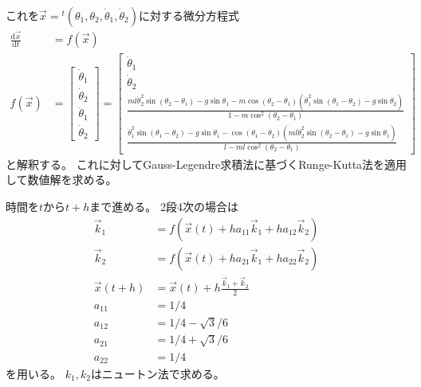 \documentclass{jsarticle}
\newcommand{\eqa}[1]{\begin{align}#1\end{align}}
\newcommand{\fn}[1]{\!\left(#1\right)}
\newcommand{\cost}[2]{\cos\left(\theta_{#1}-\theta_{#2}\right)}
\newcommand{\coste}[3]{\cos^{#3}\left(\theta_{#1}-\theta_{#2}\right)}
\newcommand{\sint}[2]{\sin\left(\theta_{#1}-\theta_{#2}\right)}
\newcommand{\dott}[1]{\dot{\theta}_{#1}}
\newcommand{\ddott}[1]{\ddot{\theta}_{#1}}
\begin{document}
これを$\vec{x}={}^t\left(\theta_1, \theta_2, \dott{1}, \dott{2}\right)$に対する微分方程式
\eqa{
	\frac{\mathrm{d}\vec{x}}{\mathrm{d}t} &= f\fn{\vec{x}} \\
	f\fn{\vec{x}} &= \begin{bmatrix}
		\dott{1} \\ \dott{2} \\ \ddott{1} \\ \dott{2}
	\end{bmatrix}
	= \begin{bmatrix}
		\dott{1} \\ \dott{2} \\
		\frac{m l \dott{2}^2 \sint{2}{1} - g \sin\theta_1 - m \cost{2}{1}\left(\dott{1}^2 \sint{1}{2} - g \sin\theta_2\right)}{1 - m \coste{2}{1}{2}} \\
		\frac{\dott{1}^2 \sint{1}{2} - g \sin\theta_1 - \cost{1}{2}\left(m l \dott{2}^2 \sint{2}{1} - g \sin\theta_1\right)}{l - m l \coste{2}{1}{2}}
	\end{bmatrix}
}
と解釈する。
これに対してGauss-Legendre求積法に基づくRunge-Kutta法を適用して数値解を求める。

時間を$t$から$t+h$まで進める。
2段4次の場合は
\eqa{
	\vec{k}_1 &= f\fn{\vec{x}\fn{t} + h a_{11} \vec{k}_1 + h a_{12} \vec{k}_2} \\
	\vec{k}_2 &= f\fn{\vec{x}\fn{t} + h a_{21} \vec{k}_1+ h a_{22} \vec{k}_2} \\
	\vec{x}\fn{t + h} &= \vec{x}\fn{t} + h \frac{\vec{k}_1 + \vec{k}_2}{2} \\
	a_{11} &= 1 / 4 \\
	a_{12} &= 1 / 4 - \sqrt{3} / 6 \\
	a_{21} &= 1 / 4 + \sqrt{3} / 6 \\
	a_{22} &= 1 / 4
}
を用いる。
$k_1, k_2$はニュートン法で求める。




\end{document}
